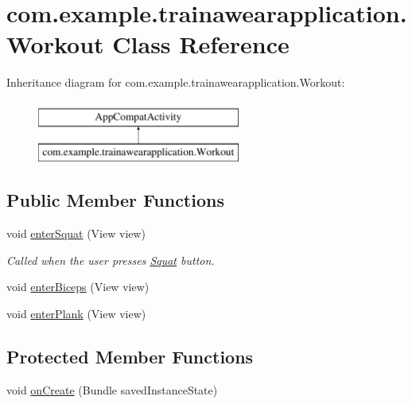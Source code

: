 \hypertarget{classcom_1_1example_1_1trainawearapplication_1_1_workout}{}\section{com.\+example.\+trainawearapplication.\+Workout Class Reference}
\label{classcom_1_1example_1_1trainawearapplication_1_1_workout}
Inheritance diagram for com.\+example.\+trainawearapplication.\+Workout\+:\begin{figure}[H]
\begin{center}
\leavevmode
\includegraphics[height=2.000000cm]{classcom_1_1example_1_1trainawearapplication_1_1_workout}
\end{center}
\end{figure}
\subsection*{Public Member Functions}
\begin{DoxyCompactItemize}
\item 
void \mbox{\hyperlink{classcom_1_1example_1_1trainawearapplication_1_1_workout_a5920ce94b756559297e72c55d7840590}{enter\+Squat}} (View view)
\begin{DoxyCompactList}\small\item\em Called when the user presses \mbox{\hyperlink{classcom_1_1example_1_1trainawearapplication_1_1_squat}{Squat}} button. \end{DoxyCompactList}\item 
void \mbox{\hyperlink{classcom_1_1example_1_1trainawearapplication_1_1_workout_a394e2b083ee2f81e83d424a1054b8724}{enter\+Biceps}} (View view)
\item 
void \mbox{\hyperlink{classcom_1_1example_1_1trainawearapplication_1_1_workout_a1f31842be78a46953f64aa6615b1dc93}{enter\+Plank}} (View view)
\end{DoxyCompactItemize}
\subsection*{Protected Member Functions}
\begin{DoxyCompactItemize}
\item 
void \mbox{\hyperlink{classcom_1_1example_1_1trainawearapplication_1_1_workout_a1a8beb733b991b8fc2b0844d77b2caa6}{on\+Create}} (Bundle saved\+Instance\+State)
\end{DoxyCompactItemize}


